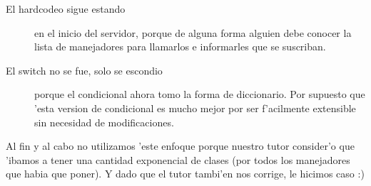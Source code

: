 \begin{description}
\item[El hardcodeo sigue estando] en el inicio del servidor, porque de alguna forma alguien debe conocer la lista de manejadores para llamarlos e informarles que se suscriban.
\item[El switch no se fue, solo se escondio] porque el condicional ahora tomo la forma de diccionario. Por supuesto que 'esta version de condicional es mucho mejor por ser f'acilmente extensible sin necesidad de modificaciones.
\end{description}

Al fin y al cabo no utilizamos 'este enfoque porque nuestro tutor consider'o que 'ibamos a tener una cantidad exponencial de clases (por todos los manejadores que habia que poner). Y dado que el tutor tambi'en nos corrige, le hicimos caso :)


